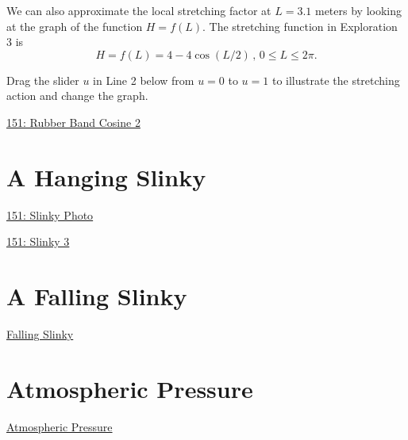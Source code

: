 \documentclass{ximera}
\begin{document}
We can also approximate the local stretching factor at $L=3.1$ meters by looking at the graph of the function $H=f(L)$. The stretching function in Exploration 3 is
\[
      H = f(L) = 4 - 4\cos (L/2) \, , \, 0\leq L \leq 2\pi.
\]

\begin{exploration} \label{ExLtegfgfgyhhhf}
Drag the slider $u$ in Line 2 below from $u=0$ to $u=1$ to illustrate the stretching action and change the graph.
\begin{onlineOnly}
    \begin{center}
\end{center}
\end{onlineOnly}

\href{https://www.desmos.com/calculator/dpxbfdwiag}{151: Rubber Band Cosine 2}

\end{exploration}





\section{A Hanging Slinky}

\begin{onlineOnly}
    \begin{center}
\end{center}
\end{onlineOnly}

\href{https://www.desmos.com/calculator/zqjjgael5j}{151: Slinky Photo}



\begin{onlineOnly}
    \begin{center}
\end{center}
\end{onlineOnly}

\href{https://www.desmos.com/calculator/ew24lplwqf}{151: Slinky 3}



\section{A Falling Slinky}

\href{https://www.youtube.com/watch?v=eCMmmEEyOO0}{Falling Slinky}


\section{Atmospheric Pressure}

\href{https://projects.iq.harvard.edu/files/acmg/files/intro_atmo_chem_bookchap2.pdf}{Atmospheric Pressure} 
\end{document}
